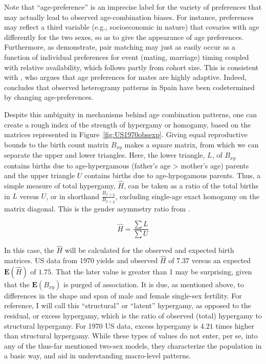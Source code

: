 Note that ``age-preference'' is an imprecise label for the variety
of preferences that may actually lead to observed age-combination biases. For
instance, preferences may reflect a third variable (e.g., socioeconomic
in nature) that covaries with age differently for the two sexes, so as to give
the appearance of age preferences. Furthermore, as \citet{bergstrom1994sweden}
demonstrate, pair matching may just as easily occur as a function of individual
preferences for event (mating, marriage) timing coupled with relative
availability, which follows partly from cohort size. This is consistent with
\citet{bhrolchain2001flexibility}, who argues that age preferences for
mates are highly adaptive. Indeed, \citet{esteve2009long} concludes that
observed heterogramy patterns in Spain have been codetermined by changing
age-preferences.

Despite this ambiguity in mechanisms behind age combination patterns, one can
create a rough index of the strength of hypergamy or homogamy, based on the
matrices represented in Figure~\ref{fig:US1970obsexp}. Giving equal reproductive
bounds to the birth count matrix $B_{xy}$ makes a square matrix, from which we
can separate the upper and lower triangles. Here, the lower triangle, $L$,
of $B_{xy}$ contains births due to age-hypergamous (father's age > mother's
age) parents and the upper triangle $U$ contains births due to
age-hypogamous parents. Thus, a simple measure of total hypergamy, $\widehat{H}$, 
can be taken as a ratio of the total births in $L$ versus $U$, or in shorthand 
$\frac{B_{x>y}}{B_{x<y}}$, excluding single-age exact homogamy on the matrix
diagonal. This is the gender asymmetry ratio from \citet{esteve2009long}.

\begin{equation}
\widehat{H} = \frac{\sum L}{\sum U} 
\end{equation}

In this case, the $\widehat{H}$ will be calculated for the observed and expected
birth matrices. US data from 1970 yields and observed $\widehat{H}$ of $7.37$
versus an expected $\textbf{E}(\widehat{H})$ of $1.75$. That the later value is
greater than 1 may be surprising, given that the $\textbf{E}(B_{xy})$ is purged
of association. It is due, as mentioned above, to differences in the shape
and span of male and female single-sex fertility. For reference, I
will call this ``structural'' or ``latent'' hypergamy, as opposed to the
residual, or excess hypergamy, which is the ratio of observed (total) hypergamy to
structural hypergamy. For 1970 US data, excess hypergamy is $4.21$ times higher
than structural hypergamy. While these types of values do not enter, per se, 
into any of the thus-far mentioned two-sex models, they characterize the 
population in a basic way, and aid in understanding macro-level patterns. 

